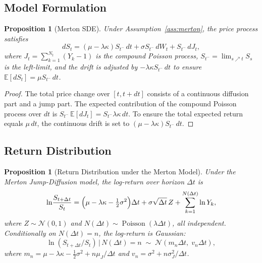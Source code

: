 \documentclass[12pt, a4paper, oneside]{report}
\theoremstyle{plain}
\newtheorem{proposition}[theorem]{Proposition}
\theoremstyle{definition}
\theoremstyle{remark}
\newcommand{\E}{\mathbb{E}}
\begin{document}
\subsection{Model Formulation}

\begin{proposition}[Merton SDE]
\label{prop:merton_sde}
Under Assumption~\ref{ass:merton}, the price process satisfies
\begin{equation}
\label{eq:merton}
  dS_t = (\mu - \lambda\kappa)S_{t^-}\,dt + \sigma S_{t^-}\,dW_t
    + S_{t^-}\,dJ_t,
\end{equation}
where $J_t = \sum_{k=1}^{N_t}(Y_k - 1)$ is the compound Poisson process,
$S_{t^-} = \lim_{s \nearrow t} S_s$ is the left-limit, and the drift is
adjusted by $-\lambda\kappa S_{t^-}\,dt$ to ensure $\E[dS_t] = \mu S_{t^-}\,dt$.
\end{proposition}

\begin{proof}
The total price change over $[t, t+dt]$ consists of a continuous diffusion part and
a jump part.  The expected contribution of the compound Poisson process over $dt$ is
$S_{t^-}\,\E[dJ_t] = S_{t^-}\lambda\kappa\,dt$.  To ensure the total expected return
equals $\mu\,dt$, the continuous drift is set to $(\mu - \lambda\kappa)S_{t^-}\,dt$.
\end{proof}

\subsection{Return Distribution}

\begin{proposition}[Return Distribution under the Merton Model]
\label{prop:merton_dist}
Under the Merton Jump-Diffusion model, the log-return over horizon $\Delta t$ is
\begin{equation}
  \ln\!\frac{S_{t+\Delta t}}{S_t}
  = \Bigl(\mu - \lambda\kappa - \tfrac{1}{2}\sigma^2\Bigr)\Delta t
    + \sigma\sqrt{\Delta t}\, Z
    + \sum_{k=1}^{N(\Delta t)} \ln Y_k,
\end{equation}
where $Z \sim \mathcal{N}(0,1)$ and $N(\Delta t) \sim \operatorname{Poisson}(\lambda\Delta t)$,
all independent.  Conditionally on $N(\Delta t) = n$, the log-return is Gaussian:
\begin{equation}
  \ln(S_{t+\Delta t}/S_t) \,\big|\, N(\Delta t) = n
  \;\sim\;
  \mathcal{N}\!\left(m_n\Delta t,\; v_n\Delta t\right),
\end{equation}
where $m_n = \mu - \lambda\kappa - \frac{1}{2}\sigma^2 + n\mu_J/\Delta t$ and
$v_n = \sigma^2 + n\sigma_J^2/\Delta t$.
\end{proposition}
\end{document}

